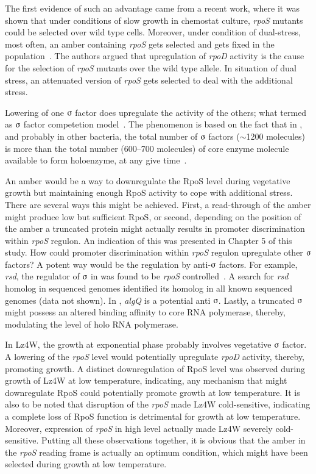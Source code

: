 The first evidence of such an advantage came from a recent work,
where it was shown that under conditions of slow growth in
chemostat culture, \emph{rpoS} mutants could be selected over wild
type cells. Moreover, under condition of dual-stress, most often,
an amber containing \emph{rpoS} gets selected and gets fixed in
the population~\citep{Mcrobb2002}. The authors argued that
upregulation of \emph{rpoD} activity is the cause for the
selection of \emph{rpoS} mutants over the wild type allele. In
situation of dual stress, an attenuated version of \emph{rpoS}
gets selected to deal with the additional stress.

Lowering of one $\sigmaup$ factor does upregulate the activity of
the others; what termed as $\sigmaup$ factor competetion
model~\citep{Farewell1998,Zhou1992}. The phenomenon is based on
the fact that in , and probably in other bacteria, the
total number of $\sigmaup$ factors ({$\sim$1200} molecules) is
more than the total number (600--700 molecules) of core enzyme
molecule available to form holoenzyme, at any give
time~\citep{Ishihama2000}.

An amber would be a way to downregulate the RpoS level during
vegetative growth but maintaining enough RpoS activity to cope
with additional stress. There are several ways this might be
achieved. First, a read-through of the amber might produce low but
sufficient RpoS, or second, depending on the position of the amber
a truncated protein might actually results in promoter
discrimination within \emph{rpoS} regulon. An indication of this
was presented in Chapter 5 of this study. How could promoter
discrimination within \emph{rpoS} regulon upregulate other
$\sigmaup$ factors? A potent way would be the regulation by
anti-$\sigmaup$ factors. For example, \emph{rsd}, the regulator of
$\sigmaup$ in  was found to be \emph{rpoS}
controlled~\citep{Jishage1999}. A search for \emph{rsd} homolog in
sequenced genomes identified its homolog in all known sequenced
genomes (data not shown). In , \emph{algQ} is a potential
anti $\sigmaup$. Lastly, a truncated $\sigmaup$ might
possess an altered binding affinity to core RNA polymerase,
thereby, modulating the level of holo RNA polymerase.

In Lz4W, the growth at exponential phase probably involves
vegetative $\sigmaup$ factor. A lowering of the \emph{rpoS} level
would potentially upregulate \emph{rpoD} activity, thereby,
promoting growth. A distinct downregulation of RpoS level was
observed during growth of Lz4W at low temperature, indicating, any
mechanism that might downregulate RpoS could potentially promote
growth at low temperature. It is also to be noted that disruption
of the \emph{rpoS} made Lz4W cold-sensitive, indicating a complete
loss of RpoS function is detrimental for growth at low
temperature. Moreover, expression of \emph{rpoS} in high level
actually made Lz4W severely cold-sensitive. Putting all these
observations together, it is obvious that the amber in the
\emph{rpoS} reading frame is actually an optimum condition, which
might have been selected during growth at low temperature.

